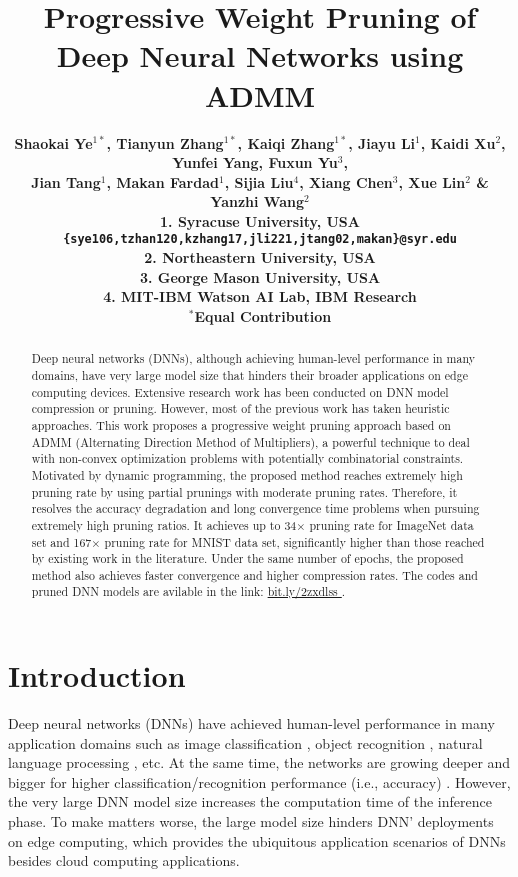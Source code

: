 \documentclass{article} %
\title{Progressive Weight Pruning of Deep Neural Networks using ADMM}
\author{\bf{Shaokai Ye$^{1*}$, Tianyun Zhang$^{1*}$,  Kaiqi Zhang$^{1*}$, Jiayu Li$^1$, Kaidi Xu$^2$, Yunfei Yang, Fuxun Yu$^3$,}\\ \bf{Jian Tang$^1$, Makan Fardad$^1$, Sijia Liu$^4$, Xiang Chen$^3$, Xue Lin$^2$ \& Yanzhi Wang$^2$}\\ 
1. Syracuse University, USA \\
\texttt{\{sye106,tzhan120,kzhang17,jli221,jtang02,makan\}@syr.edu} \\
2. Northeastern University, USA  \\ 
3. George Mason University, USA\\
4. MIT-IBM Watson AI Lab, IBM Research\\
$^*$Equal Contribution\\
}
\begin{document}
\maketitle
\begin{abstract}
Deep neural networks (DNNs), although achieving human-level performance in many domains, have very large model size that hinders their broader applications on edge computing devices.
Extensive research work has been conducted on DNN model compression or pruning.
However, most of the previous work has taken heuristic approaches.
This work proposes a progressive weight pruning approach based on ADMM (Alternating Direction Method of Multipliers), a powerful technique to deal with non-convex optimization problems with potentially combinatorial constraints.
Motivated by dynamic programming, the proposed method reaches extremely high pruning rate by using partial prunings with moderate pruning rates.
Therefore, it resolves the accuracy degradation and long convergence time problems when pursuing extremely high pruning ratios.
It achieves up to 34$\times$ pruning rate for ImageNet data set and 167$\times$ pruning rate for MNIST data set, significantly higher than those reached by existing work in the literature.
Under the same number of epochs, the proposed method also achieves faster convergence and higher compression rates. The codes and pruned DNN models are avilable in the link: \url{bit.ly/2zxdlss	}.
\end{abstract}











\section{Introduction}

Deep neural networks (DNNs) have achieved human-level performance in many application domains such as image classification \citep{krizhevsky2012imagenet}, object recognition \citep{lecun1998,he2016deep}, natural language processing \citep{hinton2012deep,dahl2012context}, etc.
At the same time, the networks are growing deeper and bigger for higher classification/recognition performance (i.e., accuracy) \citep{simonyan2015very}.
However, the very large DNN model size increases the computation time of the inference phase.
To make matters worse, the large model size hinders DNN' deployments on edge computing, which provides the ubiquitous application scenarios of DNNs besides cloud computing applications.
\end{document}
